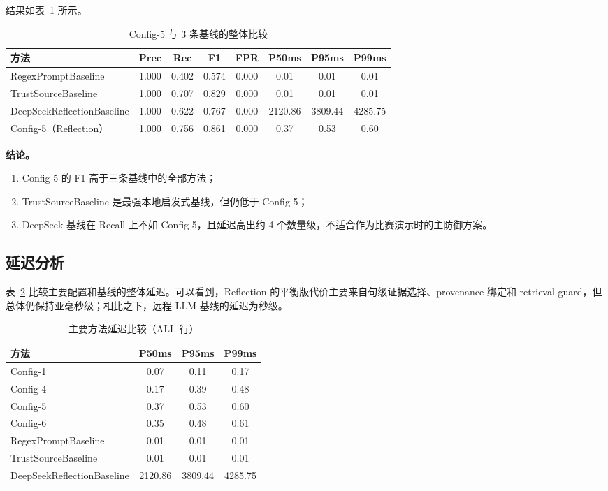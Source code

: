 \documentclass[11pt,a4paper]{ctexart}
\begin{document}
结果如表~\ref{tab:baseline} 所示。

\begin{table}[H]
\centering
\caption{Config-5 与 3 条基线的整体比较}
\label{tab:baseline}
\begin{tabular}{l c c c c c c c}
\toprule
方法 & Prec & Rec & F1 & FPR & P50ms & P95ms & P99ms \\
\midrule
RegexPromptBaseline & 1.000 & 0.402 & 0.574 & 0.000 & 0.01 & 0.01 & 0.01 \\
TrustSourceBaseline & 1.000 & 0.707 & 0.829 & 0.000 & 0.01 & 0.01 & 0.01 \\
DeepSeekReflectionBaseline & 1.000 & 0.622 & 0.767 & 0.000 & 2120.86 & 3809.44 & 4285.75 \\
Config-5（Reflection） & 1.000 & 0.756 & 0.861 & 0.000 & 0.37 & 0.53 & 0.60 \\
\bottomrule
\end{tabular}
\end{table}

\textbf{结论。}
\begin{enumerate}[leftmargin=2em]
  \item Config-5 的 F1 高于三条基线中的全部方法；
  \item TrustSourceBaseline 是最强本地启发式基线，但仍低于 Config-5；
  \item DeepSeek 基线在 Recall 上不如 Config-5，且延迟高出约 4 个数量级，不适合作为比赛演示时的主防御方案。
\end{enumerate}

\subsection{延迟分析}
表~\ref{tab:latency} 比较主要配置和基线的整体延迟。可以看到，Reflection 的平衡版代价主要来自句级证据选择、provenance 绑定和 retrieval guard，但总体仍保持亚毫秒级；相比之下，远程 LLM 基线的延迟为秒级。

\begin{table}[H]
\centering
\caption{主要方法延迟比较（ALL 行）}
\label{tab:latency}
\begin{tabular}{l c c c}
\toprule
方法 & P50ms & P95ms & P99ms \\
\midrule
Config-1 & 0.07 & 0.11 & 0.17 \\
Config-4 & 0.17 & 0.39 & 0.48 \\
Config-5 & 0.37 & 0.53 & 0.60 \\
Config-6 & 0.35 & 0.48 & 0.61 \\
RegexPromptBaseline & 0.01 & 0.01 & 0.01 \\
TrustSourceBaseline & 0.01 & 0.01 & 0.01 \\
DeepSeekReflectionBaseline & 2120.86 & 3809.44 & 4285.75 \\
\bottomrule
\end{tabular}
\end{table}
\end{document}
